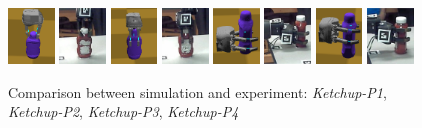 \begin{figure}[!!hbt]
\begin{center}
{\includegraphics[width=0.11\textwidth]     {images/ssoch/fig/heinz_P1}\label{heinz_P1}}%
{\includegraphics[width=0.11\textwidth]    {images/ssoch/fig/heinz_p1_1}\label{heinz_p1_1}}
{\includegraphics[width=0.11\textwidth]{images/ssoch/fig/heinz_P2}\label{heinz_P2}}%
{\includegraphics[width=0.11\textwidth]{images/ssoch/fig/heinz_p2_1}\label{heinz_p2_1}}
{ \includegraphics[width=0.11\textwidth]     {images/ssoch/fig/heinz_P4}\label{heinz_P4}}%
{\includegraphics[width=0.11\textwidth]{images/ssoch/fig/heinz_p4_1}\label{heinz_p4_1}}
{\includegraphics[width=0.11\textwidth]{images/ssoch/fig/heinz_P5}\label{heinz_P5}}%
{\includegraphics[width=0.11\textwidth]{images/ssoch/fig/heinz_p5_1}\label{heinz_p5_1}}
        \caption{Comparison between simulation and experiment: \emph{Ketchup-P1}, \emph{Ketchup-P2}, \emph{Ketchup-P3}, \emph{Ketchup-P4}}
        \label{heinz_bottle}
        \end{center}
\end{figure}


